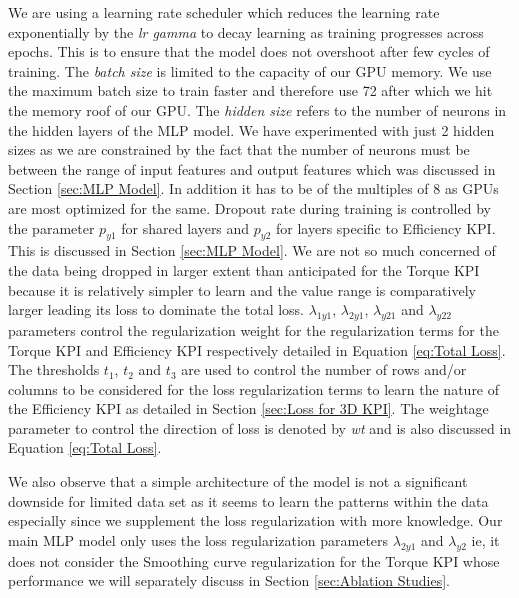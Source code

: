 \documentclass{report} %
\begin{document}
We are using a learning rate scheduler which reduces the learning rate exponentially by the \textit{lr gamma} to decay learning as training progresses across epochs.
This is to ensure that the model does not overshoot after few cycles of training.
The \textit{batch size} is limited to the capacity of our \ac{GPU} memory. We use the maximum batch size to train faster and therefore use 72 after which we hit the 
memory roof of our GPU.
The \textit{hidden size} refers to the number of neurons in the hidden layers of the \ac{MLP} model. We have experimented with just 2 hidden sizes as we are 
constrained by the fact that the number of neurons must be between the range of input features and output features which was discussed in Section \ref{sec:MLP Model}.
In addition it has to be of the multiples of 8 as \ac{GPU}s are most optimized for the same.
Dropout rate during training is controlled by the parameter \textit{$p_{y1}$} for shared layers and \textit{$p_{y2}$} for layers specific to Efficiency \ac{KPI}. 
This is discussed in Section \ref{sec:MLP Model}. We are not so much concerned of the data being dropped in larger extent than anticipated for the Torque \ac{KPI} 
because it is relatively simpler to learn and the value range is comparatively larger leading its loss to dominate the total loss.
\textit{$\lambda_{1y1}$}, \textit{$\lambda_{2y1}$}, \textit{$\lambda_{y21}$} and \textit{$\lambda_{y22}$} parameters control the regularization weight for the 
regularization terms for the Torque \ac{KPI} and Efficiency \ac{KPI} respectively detailed in Equation \ref{eq:Total Loss}.
The thresholds \textit{$t_{1}$}, \textit{$t_{2}$} and \textit{$t_{3}$} are used to control the number of rows and/or columns to be considered for the loss
regularization terms to learn the nature of the Efficiency \ac{KPI} as detailed in Section \ref{sec:Loss for 3D KPI}.
The weightage parameter to control the direction of loss is denoted by \textit{wt} and is also discussed in Equation \ref{eq:Total Loss}.

We also observe that a simple architecture of the model is not a significant downside for limited data set as it seems to learn the patterns within the data 
especially since we supplement the loss regularization with more knowledge.
Our main \ac{MLP} model only uses the loss regularization parameters \textit{$\lambda_{2y1}$} and \textit{$\lambda_{y2}$} ie, it does not consider the Smoothing curve 
regularization for the Torque \ac{KPI} whose performance we will separately discuss in Section \ref{sec:Ablation Studies}.
\end{document}
